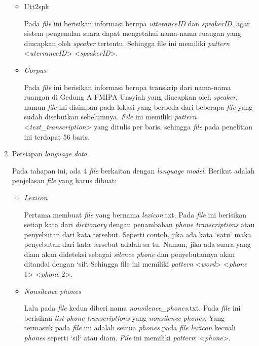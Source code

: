 \begin{enumerate}
\begin{itemize}
	\item Utt2spk
	\par Pada \textit{file} ini berisikan informasi berupa \textit{utteranceID} dan \textit{speakerID}, agar sistem pengenalan suara dapat mengetahui nama-nama ruangan yang diucapkan oleh \textit{speaker} tertentu. Sehingga file ini memiliki \textit{pattern} <\textit{uterranceID}> <\textit{speakerID}>.
	
	\item \textit{Corpus}
	\par Pada \textit{file} ini berisikan informasi berupa transkrip dari nama-nama ruangan di Gedung A FMIPA Unsyiah yang diucapkan oleh \textit{speaker}, namun \textit{file} ini disimpan pada lokasi yang berbeda dari beberapa \textit{file} yang sudah disebutkan sebelumnya. \textit{File} ini memiliki \textit{pattern} <\textit{text\_transcription}> yang ditulis per baris, sehingga \textit{file} pada penelitian ini terdapat 56 baris.
	\end{itemize}

\item Persiapan \textit{language data}
\par Pada tahapan ini, ada 4 \textit{file} berkaitan dengan \textit{language model}. Berikut adalah penjelasan \textit{file} yang harus dibuat:
	\begin{itemize}
	\item \textit{Lexicon}
	\par Pertama membuat \textit{file} yang bernama \textit{lexicon}.txt. Pada \textit{file} ini berisikan setiap kata dari \textit{dictionary} dengan penambahan \textit{phone transcriptions} atau penyebutan dari kata tersebut. Seperti contoh, jika ada kata `satu` maka penyebutan dari kata tersebut adalah sa tu. Namun, jika ada suara yang diam akan dideteksi sebagai \textit{silence phone} dan penyebutannya akan ditandai dengan `sil`. Sehingga file ini memiliki \textit{pattern} <\textit{word}> <\textit{phone} 1> <\textit{phone} 2>.
	
	\item \textit{Nonsilence phones}
	\par Lalu pada \textit{file} kedua diberi nama \textit{nonsilence\_phones}.txt. Pada \textit{file} ini berisikan \textit{list phone transcriptions} yang \textit{nonsilence phones}. Yang termasuk pada \textit{file} ini adalah semua \textit{phones} pada \textit{file lexicon} kecuali \textit{phones} seperti `sil` atau diam. \textit{File} ini memiliki \textit{pattern}: <\textit{phone}>.
	

\end{itemize}
\end{enumerate}
